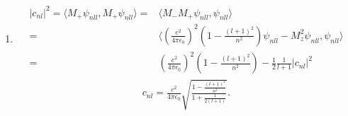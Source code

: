\begin{enumerate}
    \begin{align*}
        M^2\psi_{nll}=&\left(\frac{e^2}{4\pi\epsilon_0}\right)^2\psi_{nll}+\frac{2}{m}H(L^2+\hbar^2)\psi_{nll}\\
        =&\left(\frac{e^2}{4\pi\epsilon_0}\right)^2\psi_{nll}-\frac{2}{m}
        \frac{m}{2\hbar^2}\left(\frac{e^2}{4\pi\epsilon_0}\right)^2\frac{1}{n^2}
        \hbar^2(l(l+1)+1)\psi_{nll}\\
        =&\left(\frac{e^2}{4\pi\epsilon_0}\right)^2(1-\frac{1}{n^2}(l^2+l+1))\psi_{nll}
    \end{align*}
    \begin{align*}
        M^2\psi_{nll}=&(M_-M_+-\hbar L_z\frac{2}{m}H+M_z^2)\psi_{nll}\\
        =&M_-M_+\psi_{nll} +M_z^2\psi_{nll}+\hbar\frac{2}{m}
        \frac{m}{2\hbar^2}\left(\frac{e^2}{4\pi\epsilon_0}\right)^2\frac{1}{n^2}
        \hbar l\psi_{nll}\\
        =&M_-M_+\psi_{nll} +M_z^2\psi_{nll}+\left(\frac{e^2}{4\pi\epsilon_0}\right)^2\frac{1}{n^2}
        l\psi_{nll}
    \end{align*}
    Thus
    \begin{align*}
        M_-M_+\psi_{nll}=\left(\frac{e^2}{4\pi\epsilon_0}\right)^2(1-\frac{(l+1)^2}{n^2})\psi_{nll}
        -M_z^2\psi_{nll}
    \end{align*}
    \item 
    \begin{align*}
        |c_{nl}|^2 = \langle M_+\psi_{nll}, M_+\psi_{nll}\rangle=&
        \langle M_-M_+\psi_{nll}, \psi_{nll}\rangle\\
        =&\langle \left(\frac{e^2}{4\pi\epsilon_0}\right)^2(1-\frac{(l+1)^2}{n^2})\psi_{nll}
        -M_z^2\psi_{nll}, \psi_{nll}\rangle\\
        =&\left(\frac{e^2}{4\pi\epsilon_0}\right)^2(1-\frac{(l+1)^2}{n^2})
        -\frac{1}{2}\frac{1}{l+1}|c_{nl}|^2
    \end{align*}
    \begin{align*}
        c_{nl} = \frac{e^2}{4\pi\epsilon_0}
        \sqrt{\frac{1-\frac{(l+1)^2}{n^2}}
        {1+\frac{1}{2(l+1)}}}.
    \end{align*}
\end{enumerate}


